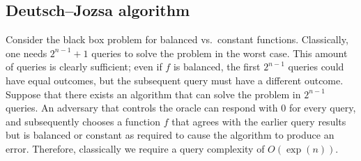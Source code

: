 \subsection{Deutsch--Jozsa algorithm}
Consider the black box problem for balanced vs.\ constant functions.
Classically, one needs \( 2^{n-1} + 1 \) queries to solve the problem in the worst case.
This amount of queries is clearly sufficient; even if \( f \) is balanced, the first \( 2^{n-1} \) queries could have equal outcomes, but the subsequent query must have a different outcome.
Suppose that there exists an algorithm that can solve the problem in \( 2^{n-1} \) queries.
An adversary that controls the oracle can respond with 0 for every query, and subsequently chooses a function \( f \) that agrees with the earlier query results but is balanced or constant as required to cause the algorithm to produce an error.
Therefore, classically we require a query complexity of \( O(\exp(n)) \).

